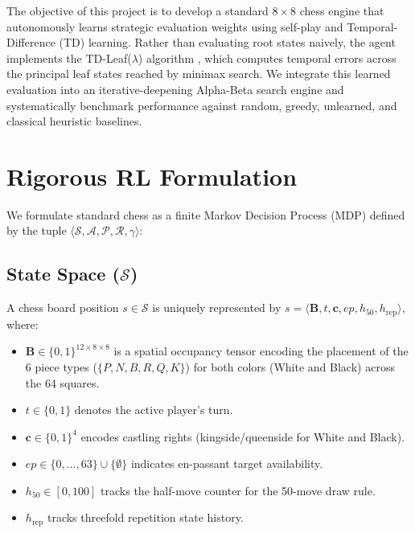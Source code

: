 \documentclass[conference,10pt,twocolumn]{IEEEtran}
\begin{document}
The objective of this project is to develop a standard $8\times 8$ chess engine that autonomously learns strategic evaluation weights using self-play and Temporal-Difference (TD) learning. Rather than evaluating root states naively, the agent implements the TD-Leaf($\lambda$) algorithm \cite{baxter1998}, which computes temporal errors across the principal leaf states reached by minimax search. We integrate this learned evaluation into an iterative-deepening Alpha-Beta search engine and systematically benchmark performance against random, greedy, unlearned, and classical heuristic baselines.

\section{Rigorous RL Formulation}
We formulate standard chess as a finite Markov Decision Process (MDP) defined by the tuple $\langle \mathcal{S}, \mathcal{A}, \mathcal{P}, \mathcal{R}, \gamma \rangle$:

\subsection{State Space ($\mathcal{S}$)}
A chess board position $s \in \mathcal{S}$ is uniquely represented by $s = \langle \mathbf{B}, t, \mathbf{c}, ep, h_{50}, h_{\text{rep}} \rangle$, where:
\begin{itemize}
    \item $\mathbf{B} \in \{0, 1\}^{12 \times 8 \times 8}$ is a spatial occupancy tensor encoding the placement of the 6 piece types ($\{P, N, B, R, Q, K\}$) for both colors (White and Black) across the 64 squares.
    \item $t \in \{0, 1\}$ denotes the active player's turn.
    \item $\mathbf{c} \in \{0, 1\}^4$ encodes castling rights (kingside/queenside for White and Black).
    \item $ep \in \{0, \dots, 63\} \cup \{\emptyset\}$ indicates en-passant target availability.
    \item $h_{50} \in [0, 100]$ tracks the half-move counter for the 50-move draw rule.
    \item $h_{\text{rep}}$ tracks threefold repetition state history.
\end{itemize}
\end{document}
